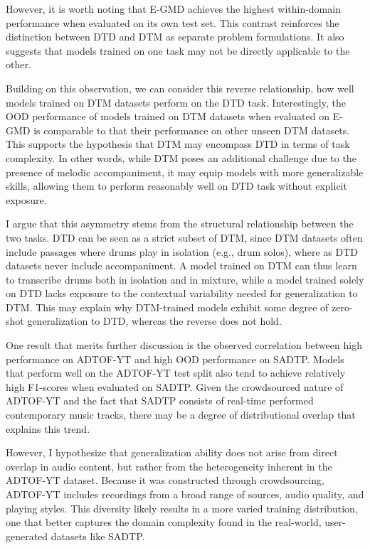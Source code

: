 However, it is worth noting that E-GMD achieves the highest within-domain performance when evaluated on its own test set. This contrast reinforces the distinction between \gls{DTD} and \gls{DTM} as separate problem formulations. It also suggests that models trained on one task may not be directly applicable to the other.

Building on this observation, we can consider this reverse relationship, how well models trained on \gls{DTM} datasets perform on the \gls{DTD} task. Interestingly, the \gls{OOD} performance of models trained on \gls{DTM} datasets when evaluated on E-GMD is comparable to that their performance on other unseen \gls{DTM} datasets. This supports the hypothesis that \gls{DTM} may encompass \gls{DTD} in terms of task complexity. In other words, while \gls{DTM} poses an additional challenge due to the presence of melodic accompaniment, it may equip models with more generalizable skills, allowing them to perform reasonably well on \gls{DTD} task without explicit exposure.

I argue that this asymmetry stems from the structural relationship between the two tasks. \gls{DTD} can be seen as a strict subset of \gls{DTM}, since \gls{DTM} datasets often include passages where drums play in isolation (e.g., drum solos), where as \gls{DTD} datasets never include accompaniment. A model trained on \gls{DTM} can thus learn to transcribe drums both in isolation and in mixture, while a model trained solely on \gls{DTD} lacks exposure to the contextual variability needed for generalization to \gls{DTM}. This may explain why \gls{DTM}-trained models exhibit some degree of zero-shot generalization to \gls{DTD}, whereas the reverse does not hold.

One result that merits further discussion is the observed correlation between high performance on ADTOF-YT and high \gls{OOD} performance on SADTP. Models that perform well on the ADTOF-YT test split also tend to achieve relatively high F1-scores when evaluated on SADTP. Given the crowdsourced nature of ADTOF-YT and the fact that SADTP consists of real-time performed contemporary music tracks, there may be a degree of distributional overlap that explains this trend.

However, I hypothesize that generalization ability does not arise from direct overlap in audio content, but rather from the heterogeneity inherent in the ADTOF-YT dataset. Because it was constructed through crowdsourcing, ADTOF-YT includes recordings from a broad range of sources, audio quality, and playing styles. This diversity likely results in a more varied training distribution, one that better captures the domain complexity found in the real-world, user-generated datasets like SADTP.

